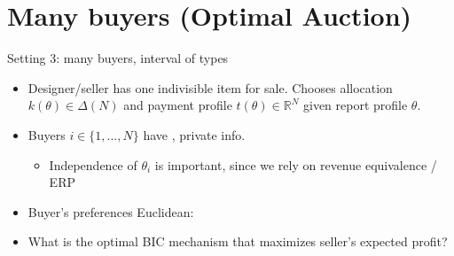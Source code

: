 \documentclass[english,10pt
,aspectratio=169
]{beamer}
\begin{document}
%
%
%
%
%


\section{Many buyers (Optimal Auction)}

\begin{frame}{Setting 3: many buyers, interval of types}
\begin{itemize}
	\item Designer/seller has one indivisible item for sale. Chooses allocation $k(\theta) \in \varDelta(N)$ and payment profile $t(\theta) \in \mathbb{R}^N$ given report profile $\theta$.
	\item Buyers $i \in \{1,...,N\}$ have , private info.
	\begin{itemize}
		\item Independence of $\theta_i$ is important, since we rely on revenue equivalence / ERP
	\end{itemize}
	\item Buyer's preferences Euclidean: 
	\item What is the optimal BIC mechanism that maximizes seller's expected profit?
\end{itemize}
\end{frame}
\end{document}
